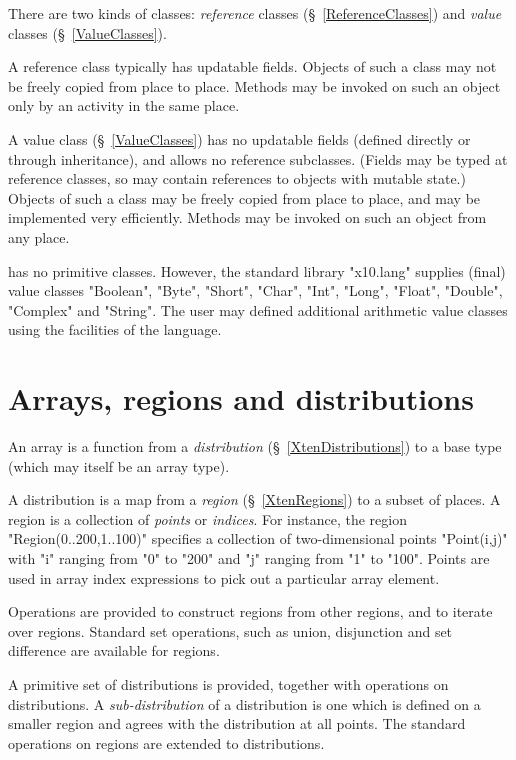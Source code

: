There are two kinds of classes: \emph{reference} classes
(\S~\ref{ReferenceClasses}) and \emph{value} classes
(\S~\ref{ValueClasses}).

A reference class typically has updatable fields. Objects of such a
class may not be freely copied from place to place. Methods may be
invoked on such an object only by an activity in the same place.

A value class (\S~\ref{ValueClasses}) has no updatable fields (defined
directly or through inheritance), and allows no reference
subclasses. (Fields may be typed at reference classes, so may contain
references to objects with mutable state.) Objects of such a class may
be freely copied from place to place, and may be implemented very
efficiently. Methods may be invoked on such an object from any place.

\Xten{} has no primitive classes. However, the standard library
\xcd"x10.lang" supplies (final) value classes \xcd"Boolean", \xcd"Byte",
\xcd"Short", \xcd"Char", \xcd"Int", \xcd"Long", \xcd"Float",
\xcd"Double", \xcd"Complex" and \xcd"String". The user may defined
additional arithmetic value classes using the facilities of the
language.

\section{Arrays, regions and distributions}

An \Xten{} array is a function from a \emph{distribution}
(\S~\ref{XtenDistributions}) to a base type (which may itself be an
array type).

A distribution is a map from a \emph{region} (\S~\ref{XtenRegions}) to a
subset of places.  A region is a collection of \emph{points} or
\emph{indices}. For instance, the region \xcd"Region(0..200,1..100)" specifies
a collection of two-dimensional points \xcd"Point(i,j)" with 
\xcd"i" ranging from \xcd"0" to \xcd"200" and \xcd"j" ranging
from \xcd"1" to \xcd"100". Points are used in array index expressions
to pick out a particular array element.

Operations are provided to construct regions from other regions, and
to iterate over regions. Standard set operations, such as union,
disjunction and set difference are available for regions.

A primitive set of distributions is provided, together with operations
on distributions. A \emph{sub-distribution} of a distribution is one
which is defined on a smaller region and agrees with the distribution
at all points.  The standard operations on regions are extended to
distributions.


